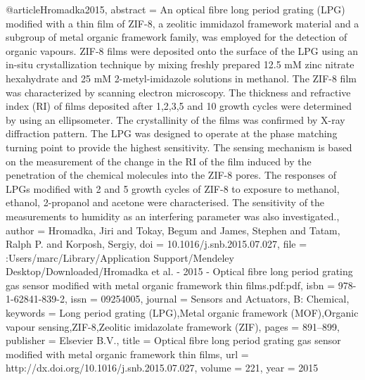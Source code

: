 @article{Hromadka2015,
abstract = {An optical fibre long period grating (LPG) modified with a thin film of ZIF-8, a zeolitic immidazol framework material and a subgroup of metal organic framework family, was employed for the detection of organic vapours. ZIF-8 films were deposited onto the surface of the LPG using an in-situ crystallization technique by mixing freshly prepared 12.5 mM zinc nitrate hexahydrate and 25 mM 2-metyl-imidazole solutions in methanol. The ZIF-8 film was characterized by scanning electron microscopy. The thickness and refractive index (RI) of films deposited after 1,2,3,5 and 10 growth cycles were determined by using an ellipsometer. The crystallinity of the films was confirmed by X-ray diffraction pattern. The LPG was designed to operate at the phase matching turning point to provide the highest sensitivity. The sensing mechanism is based on the measurement of the change in the RI of the film induced by the penetration of the chemical molecules into the ZIF-8 pores. The responses of LPGs modified with 2 and 5 growth cycles of ZIF-8 to exposure to methanol, ethanol, 2-propanol and acetone were characterised. The sensitivity of the measurements to humidity as an interfering parameter was also investigated.},
author = {Hromadka, Jiri and Tokay, Begum and James, Stephen and Tatam, Ralph P. and Korposh, Sergiy},
doi = {10.1016/j.snb.2015.07.027},
file = {:Users/marc/Library/Application Support/Mendeley Desktop/Downloaded/Hromadka et al. - 2015 - Optical fibre long period grating gas sensor modified with metal organic framework thin films.pdf:pdf},
isbn = {978-1-62841-839-2},
issn = {09254005},
journal = {Sensors and Actuators, B: Chemical},
keywords = {Long period grating (LPG),Metal organic framework (MOF),Organic vapour sensing,ZIF-8,Zeolitic imidazolate framework (ZIF)},
pages = {891--899},
publisher = {Elsevier B.V.},
title = {{Optical fibre long period grating gas sensor modified with metal organic framework thin films}},
url = {http://dx.doi.org/10.1016/j.snb.2015.07.027},
volume = {221},
year = {2015}
}
